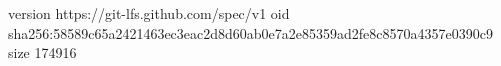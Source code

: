 version https://git-lfs.github.com/spec/v1
oid sha256:58589c65a2421463ec3eac2d8d60ab0e7a2e85359ad2fe8c8570a4357e0390c9
size 174916
